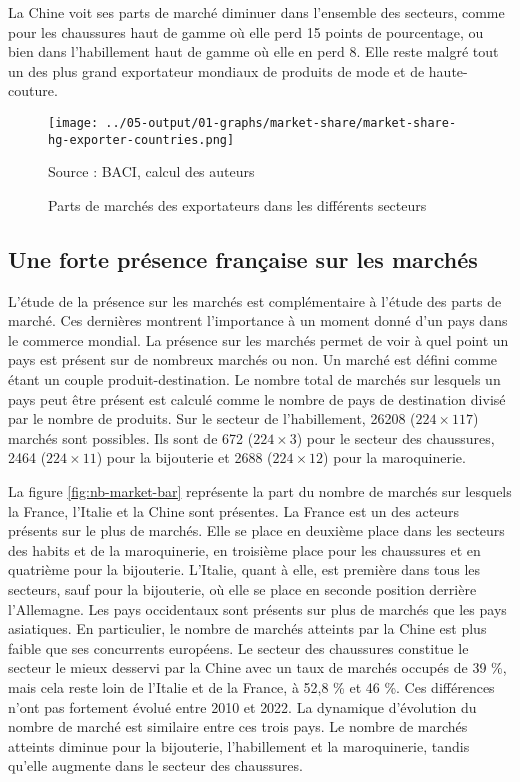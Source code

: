 \documentclass[french,10pt,a4paper]{article}
\begin{document}
La Chine voit ses parts de marché diminuer dans l'ensemble des secteurs, comme pour les chaussures haut de gamme où elle perd 15 points de pourcentage, ou bien dans l'habillement haut de gamme où elle en perd 8. Elle reste malgré tout un des plus grand exportateur mondiaux de produits de mode et de haute-couture.

\begin{figure}[!h]
  \centering
  \texttt{[image: ../05-output/01-graphs/market-share/market-share-hg-exporter-countries.png]}
  \captionsetup{justification=raggedright,singlelinecheck=false, font=small}
  \caption*{Source : BACI, calcul des auteurs}
  \captionsetup{justification=centering, singlelinecheck=true, font=normalsize}
  \caption{Parts de marchés des exportateurs dans les différents secteurs}
  \label{fig:market-share}
\end{figure}

\subsection{Une forte présence française sur les marchés}
L'étude de la présence sur les marchés est complémentaire à l'étude des parts de marché. Ces dernières montrent l'importance à un moment donné d'un pays dans le commerce mondial. La présence sur les marchés permet de voir à quel point un pays est présent sur de nombreux marchés ou non. Un marché est défini comme étant un couple produit-destination. Le nombre total de marchés sur lesquels un pays peut être présent est calculé comme le nombre de pays de destination divisé par le nombre de produits. Sur le secteur de l'habillement, 26208 ($224 \times 117$) marchés sont possibles. Ils sont de 672 ($224 \times 3$) pour le secteur des chaussures, 2464 ($224 \times 11$) pour la bijouterie et 2688 ($224 \times 12$) pour la maroquinerie.

\bigskip

La figure \ref{fig:nb-market-bar} représente la part du nombre de marchés sur lesquels la France, l'Italie et la Chine sont présentes. La France est un des acteurs présents sur le plus de marchés. Elle se place en deuxième place dans les secteurs des habits et de la maroquinerie, en troisième place pour les chaussures et en quatrième pour la bijouterie. L'Italie, quant à elle, est première dans tous les secteurs, sauf pour la bijouterie, où elle se place en seconde position derrière l'Allemagne. Les pays occidentaux sont présents sur plus de marchés que les pays asiatiques. En particulier, le nombre de marchés atteints par la Chine est plus faible que ses concurrents européens. Le secteur des chaussures constitue le secteur le mieux desservi par la Chine avec un taux de marchés occupés de 39 \%, mais cela reste loin de l'Italie et de la France, à 52,8 \% et 46 \%. Ces différences n'ont pas fortement évolué entre 2010 et 2022. La dynamique d'évolution du nombre de marché est similaire entre ces trois pays. Le nombre de marchés atteints diminue pour la bijouterie, l'habillement et la maroquinerie, tandis qu'elle augmente dans le secteur des chaussures.
\end{document}
